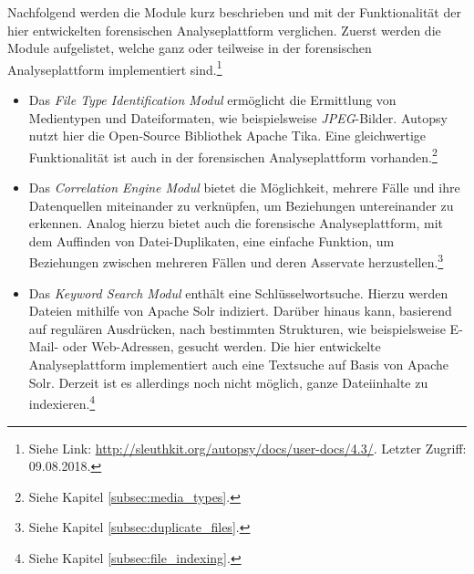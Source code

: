 \noindent
Nachfolgend werden die Module kurz beschrieben und mit der Funktionalität der hier entwickelten forensischen Analyseplattform verglichen. Zuerst werden die Module aufgelistet, welche ganz oder teilweise in der forensischen Analyseplattform implementiert sind.\footnote{Siehe Link: \url{http://sleuthkit.org/autopsy/docs/user-docs/4.3/}. Letzter Zugriff: 09.08.2018.}

\begin{itemize}
\item Das \textit{File Type Identification Modul} ermöglicht die Ermittlung von Medientypen und Dateiformaten, wie beispielsweise \textit{JPEG}-Bilder. Autopsy nutzt hier die Open-Source Bibliothek Apache Tika\texttrademark. Eine gleichwertige Funktionalität ist auch in der forensischen Analyseplattform vorhanden.\footnote{Siehe Kapitel \ref{subsec:media_types}.}
\item Das \textit{Correlation Engine Modul} bietet die Möglichkeit, mehrere Fälle und ihre Datenquellen miteinander zu verknüpfen, um Beziehungen untereinander zu erkennen. Analog hierzu bietet auch die forensische Analyseplattform, mit dem Auffinden von Datei-Duplikaten, eine einfache Funktion, um Beziehungen zwischen mehreren Fällen und deren Asservate herzustellen.\footnote{Siehe Kapitel \ref{subsec:duplicate_files}.}
\item Das \textit{Keyword Search Modul} enthält eine Schlüsselwortsuche. Hierzu werden Dateien mithilfe von Apache Solr indiziert. Darüber hinaus kann, basierend auf regulären Ausdrücken, nach bestimmten Strukturen, wie beispielsweise E-Mail- oder Web-Adressen, gesucht werden. Die hier entwickelte Analyseplattform implementiert auch eine Textsuche auf Basis von Apache Solr. Derzeit ist es allerdings noch nicht möglich, ganze Dateiinhalte zu indexieren.\footnote{Siehe Kapitel \ref{subsec:file_indexing}.}
\end{itemize}

